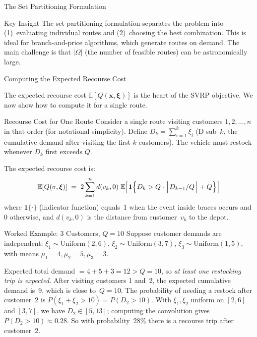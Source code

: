 \documentclass[aspectratio=169,10pt]{beamer}
\begin{document}
\begin{frame}[allowframebreaks]{The Set Partitioning Formulation}
  \begin{alertblock}{Key Insight}
    The set partitioning formulation separates the problem into
    (1)~evaluating individual routes and (2)~choosing the best combination.
    This is ideal for branch-and-price algorithms, which generate routes
    on demand.  The main challenge is that $|\Omega|$ (the number of
    feasible routes) can be astronomically large.
  \end{alertblock}

\end{frame}

\begin{frame}[allowframebreaks]{Computing the Expected Recourse Cost}

  The expected recourse cost $\mathbb{E}[Q(\mathbf{x}, \boldsymbol{\xi})]$
  is the heart of the SVRP objective.
  We now show how to compute it for a single route.

  \begin{block}{Recourse Cost for One Route}
    Consider a single route visiting customers $1, 2, \ldots, n$ in that
    order (for notational simplicity).
    Define $D_k = \sum_{i=1}^{k} \xi_i$ (D sub~$k$, the cumulative demand
    after visiting the first $k$ customers).
    The vehicle must restock whenever $D_k$ first exceeds $Q$.

    The expected recourse cost is:
    \[
      \mathbb{E}[Q(\sigma,\boldsymbol{\xi})]
      \;=\; 2\sum_{k=1}^{n}
            d(v_k, 0)\;
            \mathbb{E}\!\left[
              \mathbf{1}\!\left\{D_k > Q \cdot \Bigl\lfloor D_{k-1}/Q \Bigr\rfloor
                                        + Q \right\}
            \right]
    \]
    where $\mathbf{1}\{\cdot\}$ (indicator function) equals~1 when the
    event inside braces occurs and 0 otherwise, and $d(v_k, 0)$ is the
    distance from customer~$v_k$ to the depot.
  \end{block}

  \begin{exampleblock}{Worked Example: 3 Customers, $Q=10$}
    Suppose customer demands are independent:
    $\xi_1 \sim \text{Uniform}(2,6)$,
    $\xi_2 \sim \text{Uniform}(3,7)$,
    $\xi_3 \sim \text{Uniform}(1,5)$,
    with means $\mu_1=4, \mu_2=5, \mu_3=3$.

    \medskip
    Expected total demand $= 4 + 5 + 3 = 12 > Q = 10$, so \emph{at least
    one restocking trip is expected}.
    After visiting customers 1 and~2, the expected cumulative demand is~9,
    which is close to~$Q=10$.
    The probability of needing a restock after customer~2 is
    $P(\xi_1 + \xi_2 > 10) = P(D_2 > 10)$.
    With $\xi_1, \xi_2$ uniform on $[2,6]$ and $[3,7]$, we have
    $D_2 \in [5, 13]$;
    computing the convolution gives $P(D_2 > 10) \approx 0.28$.
    So with probability~28\% there is a recourse trip after customer~2.
  \end{exampleblock}


\end{frame}
\end{document}
